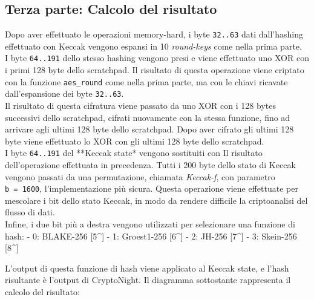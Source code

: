 \subsection{Terza parte: Calcolo del
risultato}\label{terza-parte-calcolo-del-risultato}

Dopo aver effettuato le operazioni memory-hard, i byte \texttt{32..63}
dati dall'hashing effettuato con Keccak vengono espansi in 10
\emph{round-keys} come nella prima parte.\\
I byte \texttt{64..191} dello stesso hashing vengono presi e viene
effettuato uno XOR con i primi 128 byte dello scratchpad. Il risultato
di questa operazione viene criptato con la funzione \texttt{aes\_round}
come nella prima parte, ma con le chiavi ricavate dall'espansione dei
byte \texttt{32..63}.\\
Il risultato di questa cifratura viene passato da uno XOR con i 128
bytes successivi dello scratchpad, cifrati nuovamente con la stessa
funzione, fino ad arrivare agli ultimi 128 byte dello scratchpad. Dopo
aver cifrato gli ultimi 128 byte viene effettuato lo XOR con gli ultimi
128 byte dello scratchpad.\\
I byte \texttt{64..191} del **Keccak state* vengono sostituiti con Il
risultato dell'operazione effettuata in precedenza. Tutti i 200 byte
dello stato di Keccak vengono passati da una permutazione, chiamata
\emph{Keccak-f}, con parametro \texttt{b\ =\ 1600}, l'implementazione
più sicura. Questa operazione viene effettuate per mescolare i bit dello
stato Keccak, in modo da rendere difficile la criptoanalisi del flusso
di dati.\\
Infine, i due bit più a destra vengono utilizzati per selezionare una
funzione di hash: - 0: BLAKE-256 {[}5\^{}{]} - 1: Groest1-256
{[}6\^{}{]} - 2: JH-256 {[}7\^{}{]} - 3: Skein-256 {[}8\^{}{]}

L'output di questa funzione di hash viene applicato al Keccak state, e
l'hash risultante è l'output di CryptoNight. Il diagramma sottostante
rappresenta il calcolo del risultato:

